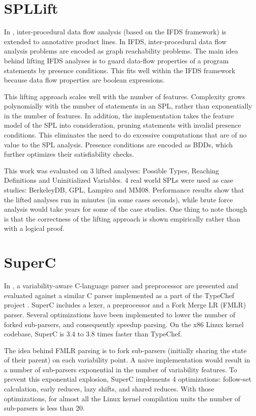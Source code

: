 \documentclass[11pt]{article}
\begin{document}
\section{SPLLift}

In \cite{Bodden:2013}, inter-procedural data flow analysis (based on the IFDS \cite{Reps:1995} framework) is extended to annotative product lines. In IFDS, inter-procedural data flow analysis problems are encoded as graph reachability problems. The main idea behind lifting IFDS analyses is to guard data-flow properties of a program statements by presence conditions. This fits well within the IFDS framework because data flow properties are boolean expressions.

This lifting approach scales well with the number of features. Complexity grows polynomially with the number of statements in an SPL, rather than exponentially in the number of features. In addition, the implementation takes the feature model of the SPL into consideration, pruning statements with invalid presence conditions. This eliminates the need to do excessive computations that are of no value to the SPL analysis. Presence conditions are encoded as BDDs, which further optimizes their satisfiability checks.

This work was evaluated on 3 lifted analyses: Possible Types, Reaching Definitions and Uninitialized Variables. 4 real world SPLs were used as case studies: BerkeleyDB, GPL, Lampiro and MM08. Performance results show that the lifted analyses run in minutes (in some cases seconds), while brute force analysis would take years for some of the case studies. One thing to note though is that the correctness of the lifting approach is shown empirically rather than with a logical proof.

\section{SuperC}
In \cite{Gazzillo:2012}, a variability-aware C-language parser and preprocessor are presented and evaluated against a similar C parser implemented as a part of the TypeChef project \cite{Kastner:2011}. SuperC includes a lexer, a preprocessor and a Fork Merge LR (FMLR) parser. Several optimizations have been implemented to lower the number of forked sub-parsers, and consequently speedup parsing. On the x86 Linux kernel codebase, SuperC is 3.4 to 3.8 times faster than TypeChef.

The idea behind FMLR parsing is to fork sub-parsers (initially sharing the state of their parent) on each variability point. A naive implementation would result in a number of sub-parsers exponential in the number of variability features. To prevent this exponential explosion, SuperC implements 4 optimizations: follow-set calculation, early reduces, lazy shifts, and shared reduces. With those optimizations, for almost all the Linux kernel compilation units the number of sub-parsers is less than 20.
\end{document}
